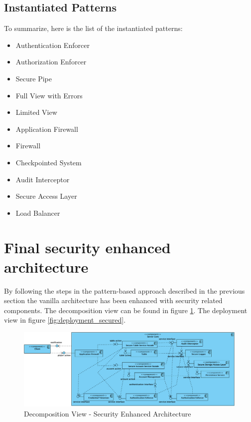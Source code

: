 \documentclass[a4paper,11pt]{report}
\begin{document}
\subsection{Instantiated Patterns}
To summarize, here is the list of the instantiated patterns:
\begin{itemize}
\item Authentication Enforcer
\item Authorization Enforcer
\item Secure Pipe
\item Full View with Errors
\item Limited View
\item Application Firewall
\item Firewall
\item Checkpointed System
\item Audit Interceptor
\item Secure Access Layer
\item Load Balancer
\end{itemize}

\section{Final security enhanced architecture}
By following the steps in the pattern-based approach described in the previous section the vanilla architecture has been enhanced with security related components. The decomposition view can be found in figure \ref{fig:decomposition_secured}. The deployment view in figure \ref{fig:deployment_secured}.

\begin{figure}[h]
  \begin{center}
    \includegraphics[angle=90,scale=0.65]{component_secured.png}
  \end{center}
  \caption{Decomposition View - Security Enhanced Architecture}\label{fig:decomposition_secured}
\end{figure}
\end{document}
